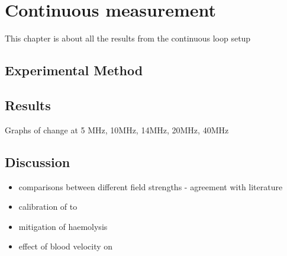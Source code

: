 \chapter{Continuous \SOtwo measurement}
\label{ch:cont}

This chapter is about all the results from the continuous loop setup
\section{Experimental Method}
\section{Results}

Graphs of \Ttwo change at 5 MHz, 10MHz, 14MHz, 20MHz, 40MHz

\section{Discussion}
\begin{itemize}
\item comparisons between different field strengths - agreement with literature
\item calibration of \Kzero to \SOtwo
\item mitigation of haemolysis
\item effect of blood velocity on \Ttwo

\end{itemize}

